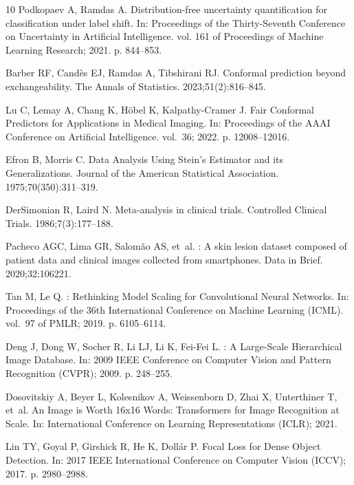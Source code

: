 \documentclass[VANCOUVER,Times1COL]{WileyNJDv5}
\begin{document}
\begin{thebibliography}{10}
Podkopaev A, Ramdas A.
\newblock Distribution-free uncertainty quantification for classification under
  label shift.
\newblock In: Proceedings of the Thirty-Seventh Conference on Uncertainty in
  Artificial Intelligence. vol. 161 of Proceedings of Machine Learning
  Research; 2021. p. 844--853.

Barber RF, Cand{\`e}s EJ, Ramdas A, Tibshirani RJ.
\newblock Conformal prediction beyond exchangeability.
\newblock The Annals of Statistics. 2023;51(2):816--845.

Lu C, Lemay A, Chang K, H{\"o}bel K, Kalpathy-Cramer J.
\newblock Fair Conformal Predictors for Applications in Medical Imaging.
\newblock In: Proceedings of the AAAI Conference on Artificial Intelligence.
  vol.~36; 2022. p. 12008--12016.

Efron B, Morris C.
\newblock Data Analysis Using {S}tein's Estimator and its Generalizations.
\newblock Journal of the American Statistical Association.
  1975;70(350):311--319.

DerSimonian R, Laird N.
\newblock Meta-analysis in clinical trials.
\newblock Controlled Clinical Trials. 1986;7(3):177--188.

Pacheco AGC, Lima GR, Salom{\~a}o AS, et~al.
: A skin lesion dataset composed of patient data and
  clinical images collected from smartphones.
\newblock Data in Brief. 2020;32:106221.

Tan M, Le Q.
: Rethinking Model Scaling for Convolutional Neural
  Networks.
\newblock In: Proceedings of the 36th International Conference on Machine
  Learning (ICML). vol.~97 of PMLR; 2019. p. 6105--6114.

Deng J, Dong W, Socher R, Li LJ, Li K, Fei-Fei L.
: A Large-Scale Hierarchical Image Database.
\newblock In: 2009 IEEE Conference on Computer Vision and Pattern Recognition
  (CVPR); 2009. p. 248--255.

Dosovitskiy A, Beyer L, Kolesnikov A, Weissenborn D, Zhai X, Unterthiner T,
  et~al.
\newblock An Image is Worth 16x16 Words: Transformers for Image Recognition at
  Scale.
\newblock In: International Conference on Learning Representations (ICLR);
  2021.

Lin TY, Goyal P, Girshick R, He K, Doll{\'a}r P.
\newblock Focal Loss for Dense Object Detection.
\newblock In: 2017 IEEE International Conference on Computer Vision (ICCV);
  2017. p. 2980--2988.


\end{thebibliography}
\end{document}
